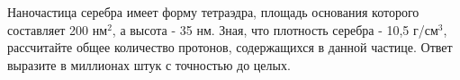 
Наночастица серебра имеет форму тетраэдра, площадь основания
которого составляет 200 нм$^2$, а высота - 35 нм. Зная, что плотность
серебра - 10,5 г/см$^3$, рассчитайте общее количество протонов,
содержащихся в данной частице. Ответ выразите в миллионах штук с точностью до
целых.



